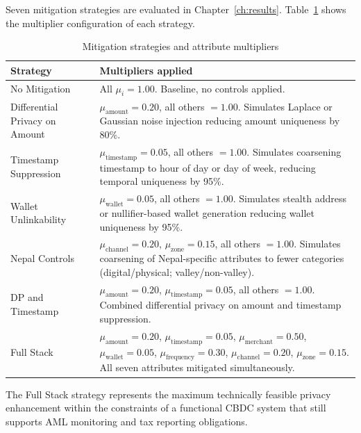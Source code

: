 Seven mitigation strategies are evaluated in
Chapter~\ref{ch:results}. Table~\ref{tab:mitigations}
shows the multiplier configuration of each strategy.

\begin{table}[H]
\centering
\caption{Mitigation strategies and attribute multipliers}
\label{tab:mitigations}
\begin{tabular}{lp{8cm}}
\toprule
\textbf{Strategy} & \textbf{Multipliers applied} \\
\midrule
No Mitigation &
All $\mu_i = 1.00$. Baseline, no controls applied. \\

Differential Privacy on Amount &
$\mu_{\mathrm{amount}} = 0.20$, all others $= 1.00$.
Simulates Laplace or Gaussian noise injection reducing
amount uniqueness by 80\%. \\

Timestamp Suppression &
$\mu_{\mathrm{timestamp}} = 0.05$, all others $= 1.00$.
Simulates coarsening timestamp to hour of day or day
of week, reducing temporal uniqueness by 95\%. \\

Wallet Unlinkability &
$\mu_{\mathrm{wallet}} = 0.05$, all others $= 1.00$.
Simulates stealth address or nullifier-based wallet
generation reducing wallet uniqueness by 95\%. \\

Nepal Controls &
$\mu_{\mathrm{channel}} = 0.20$,
$\mu_{\mathrm{zone}} = 0.15$, all others $= 1.00$.
Simulates coarsening of Nepal-specific attributes to
fewer categories (digital/physical; valley/non-valley). \\

DP and Timestamp &
$\mu_{\mathrm{amount}} = 0.20$,
$\mu_{\mathrm{timestamp}} = 0.05$,
all others $= 1.00$.
Combined differential privacy on amount and
timestamp suppression. \\

Full Stack &
$\mu_{\mathrm{amount}} = 0.20$,
$\mu_{\mathrm{timestamp}} = 0.05$,
$\mu_{\mathrm{merchant}} = 0.50$,
$\mu_{\mathrm{wallet}} = 0.05$,
$\mu_{\mathrm{frequency}} = 0.30$,
$\mu_{\mathrm{channel}} = 0.20$,
$\mu_{\mathrm{zone}} = 0.15$.
All seven attributes mitigated simultaneously. \\
\bottomrule
\end{tabular}
\end{table}

The Full Stack strategy represents the maximum technically
feasible privacy enhancement within the constraints of
a functional CBDC system that still supports AML
monitoring and tax reporting obligations.


